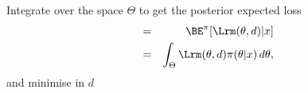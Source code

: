 \begin{slide}



\end{slide}\begin{slide}
{} Integrate over the space $\Theta$
to get the posterior expected loss
\begin{eqnarray*}
      & = & \BE^\pi[\Lrm(\theta,d)|x] \\
      & = & \int_{\Theta} \Lrm(\theta,d) \pi(\theta|x)\, d\theta,
\end{eqnarray*}
and minimise in $d$

\end{slide}\begin{slide}
{}

\end{slide}
